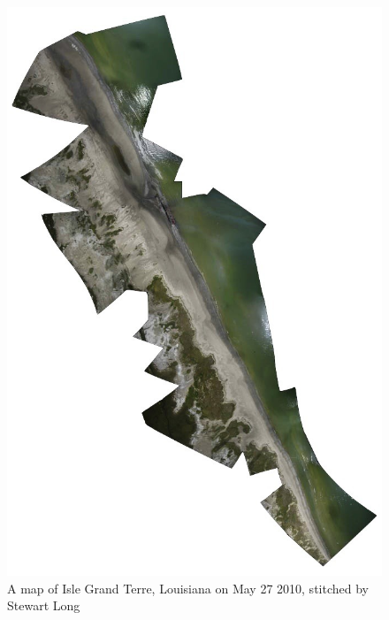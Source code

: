 \documentclass[11pt,oneside,notitlepage]{report}
\begin{document}
{{\begin{figure}[p]
  \begin{center}
	\includegraphics[height=0.8\textheight]{images/grand-isle-terre.jpg}
	\caption{A map of Isle Grand Terre, Louisiana on May 27 2010, stitched by Stewart Long}
  \end{center}
\end{figure}

}}
\end{document}
